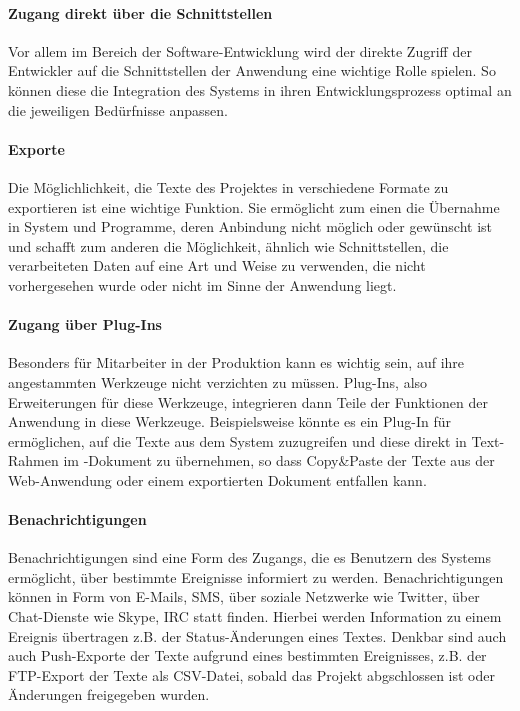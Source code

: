 \paragraph{Zugang direkt über die Schnittstellen} Vor allem im Bereich der Software-Entwicklung wird der direkte Zugriff der Entwickler auf die Schnittstellen der Anwendung eine wichtige Rolle spielen. So können diese die Integration des Systems in ihren Entwicklungsprozess optimal an die jeweiligen Bedürfnisse anpassen.

\paragraph{Exporte} Die Möglichlichkeit, die Texte des Projektes in verschiedene Formate zu exportieren ist eine wichtige Funktion. Sie ermöglicht zum einen die Übernahme in System und Programme, deren Anbindung nicht möglich oder gewünscht ist und schafft zum anderen die Möglichkeit, ähnlich wie Schnittstellen, die verarbeiteten Daten auf eine Art und Weise zu verwenden, die nicht vorhergesehen wurde oder nicht im Sinne der Anwendung liegt.

\paragraph{Zugang über Plug-Ins} Besonders für Mitarbeiter in der Produktion kann es wichtig sein, auf ihre angestammten Werkzeuge nicht verzichten zu müssen. Plug-Ins, also Erweiterungen für diese Werkzeuge, integrieren dann Teile der Funktionen der Anwendung in diese Werkzeuge. Beispielsweise könnte es ein Plug-In für  ermöglichen, auf die Texte aus dem System zuzugreifen und diese direkt in Text-Rahmen im -Dokument zu übernehmen, so dass Copy\&Paste der Texte aus der Web-Anwendung oder einem exportierten Dokument entfallen kann.

\paragraph{Benachrichtigungen} Benachrichtigungen sind eine Form des Zugangs, die es Benutzern des Systems ermöglicht, über bestimmte Ereignisse informiert zu werden. Benachrichtigungen können in Form von E-Mails, SMS, über soziale Netzwerke wie Twitter, über Chat-Dienste wie Skype, IRC statt finden. Hierbei werden Information zu einem Ereignis übertragen z.B. der Status-Änderungen eines Textes. Denkbar sind auch auch Push-Exporte der Texte aufgrund eines bestimmten Ereignisses, z.B. der FTP-Export der Texte als CSV-Datei, sobald das Projekt abgschlossen ist oder Änderungen freigegeben wurden.


